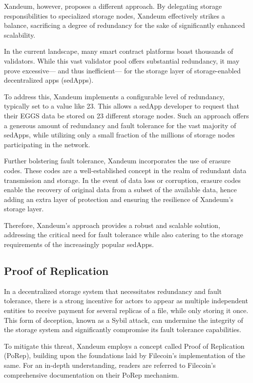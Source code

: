 \documentclass[11pt]{article}   	%
\begin{document}
Xandeum, however, proposes a different approach. By delegating storage responsibilities to specialized storage nodes, Xandeum effectively strikes a balance, sacrificing a degree of redundancy for the sake of significantly enhanced scalability.

In the current landscape, many smart contract platforms boast thousands of validators. While this vast validator pool offers substantial redundancy, it may prove excessive— and thus inefficient— for the storage layer of storage-enabled decentralized apps (sedApps).

To address this, Xandeum implements a configurable level of redundancy, typically set to a value like 23. This allows a sedApp developer to request that their EGGS data be stored on 23 different storage nodes. Such an approach offers a generous amount of redundancy and fault tolerance for the vast majority of sedApps, while utilizing only a small fraction of the millions of storage nodes participating in the network.

Further bolstering fault tolerance, Xandeum incorporates the use of erasure codes. These codes are a well-established concept in the realm of redundant data transmission and storage. In the event of data loss or corruption, erasure codes enable the recovery of original data from a subset of the available data, hence adding an extra layer of protection and ensuring the resilience of Xandeum's storage layer.

Therefore, Xandeum's approach provides a robust and scalable solution, addressing the critical need for fault tolerance while also catering to the storage requirements of the increasingly popular sedApps.

\subsection{Proof of Replication}
In a decentralized storage system that necessitates redundancy and fault tolerance, there is a strong incentive for actors to appear as multiple independent entities to receive payment for several replicas of a file, while only storing it once. This form of deception, known as a Sybil attack, can undermine the integrity of the storage system and significantly compromise its fault tolerance capabilities.

To mitigate this threat, Xandeum employs a concept called Proof of Replication (PoRep), building upon the foundations laid by Filecoin's implementation of the same. For an in-depth understanding, readers are referred to Filecoin's comprehensive documentation on their PoRep mechanism.
\end{document}

